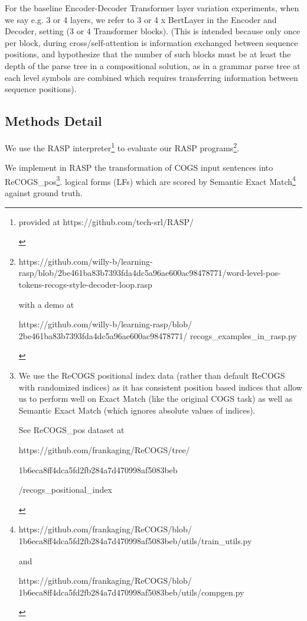 \documentclass[11pt]{article}
\begin{document}
For the \cite{Wu2023} baseline Encoder-Decoder Transformer layer variation experiments, 
when we say e.g. 3 or 4 layers, we refer to 3 or 4 x BertLayer in the Encoder and Decoder, setting (3 or 4 Transformer blocks).
(This is intended because only once per block, during cross/self-attention is information exchanged between sequence positions, and \cite{Csordas2022} hypothesize that the number of such blocks must be at least the depth of the parse tree in a compositional solution, as in a grammar parse tree at each level symbols are combined which requires transferring information between sequence positions).
\clearpage

\subsection{Methods Detail}
\label{methods_detail}

We use the RASP \cite{Weiss2021} interpreter\footnote{\begin{footnotesize}provided at https://github.com/tech-srl/RASP/
\end{footnotesize}
} to evaluate our RASP programs\footnote{\begin{footnotesize}https://github.com/willy-b/learning-rasp/blob/2be461ba83b7393fda4dc5a96ae600ac98478771/word-level-pos-tokens-recogs-style-decoder-loop.rasp

with a demo at

https://github.com/willy-b/learning-rasp/blob/
2be461ba83b7393fda4dc5a96ae600ac98478771/
recogs\_examples\_in\_rasp.py 
\end{footnotesize}
}.

We implement in RASP the transformation of COGS input sentences into ReCOGS\_pos\footnote{
\begin{footnotesize}We use the ReCOGS positional index data (rather than default ReCOGS with randomized indices) as it has consistent position based indices that allow us to perform well on Exact Match (like the original COGS task) as well as Semantic Exact Match (which ignores absolute values of indices).

See ReCOGS\_pos dataset at 

https://github.com/frankaging/ReCOGS/tree/

1b6eca8ff4dca5fd2fb284a7d470998af5083beb

/recogs\_positional\_index 
\end{footnotesize}
}. logical forms (LFs) which are scored by Semantic Exact Match\footnote{ 
\begin{footnotesize}https://github.com/frankaging/ReCOGS/blob/
1b6eca8ff4dca5fd2fb284a7d470998af5083beb/utils/train\_utils.py

and

https://github.com/frankaging/ReCOGS/blob/
1b6eca8ff4dca5fd2fb284a7d470998af5083beb/utils/compgen.py
\end{footnotesize}
} against ground truth.
\end{document}
